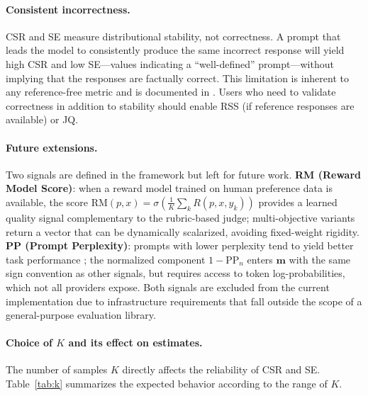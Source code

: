 \documentclass[11pt,a4paper]{article}
\begin{document}
\paragraph{Consistent incorrectness.}
CSR and SE measure distributional stability, not correctness. A prompt that leads the model to consistently produce the same incorrect response will yield high CSR and low SE—values indicating a ``well-defined'' prompt—without implying that the responses are factually correct. This limitation is inherent to any reference-free metric and is documented in \citet{glape2024}. Users who need to validate correctness in addition to stability should enable RSS (if reference responses are available) or JQ.

\paragraph{Future extensions.}
Two signals are defined in the framework but left for future work. \textbf{RM (Reward Model Score)}: when a reward model trained on human preference data is available, the score $\mathrm{RM}(p, x) = \sigma\!\left(\frac{1}{K}\sum_k R(p, x, y_k)\right)$ provides a learned quality signal complementary to the rubric-based judge; multi-objective variants \citep{armorm2024} return a vector that can be dynamically scalarized, avoiding fixed-weight rigidity. \textbf{PP (Prompt Perplexity)}: prompts with lower perplexity tend to yield better task performance \citep{promptperplexity2022}; the normalized component $1 - \mathrm{PP}_n$ enters $\mathbf{m}$ with the same sign convention as other signals, but requires access to token log-probabilities, which not all providers expose. Both signals are excluded from the current implementation due to infrastructure requirements that fall outside the scope of a general-purpose evaluation library.

\paragraph{Choice of $K$ and its effect on estimates.}
The number of samples $K$ directly affects the reliability of CSR and SE. Table~\ref{tab:k} summarizes the expected behavior according to the range of $K$.
\end{document}
